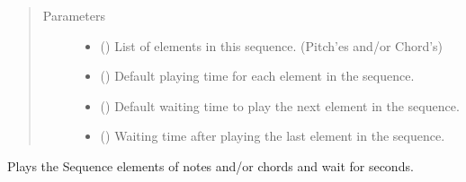 \documentclass[letterpaper,10pt,english]{sphinxmanual}
\begin{document}
\begin{fulllineitems}
\begin{fulllineitems}
\begin{description}
\end{description}
\begin{quote}\begin{description}
\item[{Parameters}] \leavevmode\begin{itemize}
\item {} 
\sphinxAtStartPar
{} () \textendash{} List of elements in this sequence.
(Pitch’es and/or Chord’s)

\item {} 
\sphinxAtStartPar
{} () \textendash{} Default playing time for each element in the
sequence.

\item {} 
\sphinxAtStartPar
{} () \textendash{} Default waiting time to play the next element
in the sequence.

\item {} 
\sphinxAtStartPar
{} () \textendash{} Waiting time after playing the last element
in the sequence.

\end{itemize}

\end{description}\end{quote}

\end{fulllineitems}


\begin{fulllineitems}
\label{\detokenize{birdears:birdears.sequence.Sequence.async_play}}
\sphinxAtStartPar
Plays the Sequence elements of notes and/or chords and wait for
 seconds.

\end{fulllineitems}



\end{fulllineitems}
\end{document}
